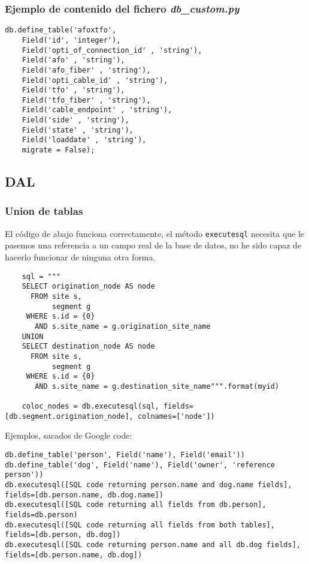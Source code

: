 \documentclass[12pt,spanish,]{article}
\begin{document}
\subsubsection{\texorpdfstring{Ejemplo de contenido del fichero
\emph{db\_custom.py}}{Ejemplo de contenido del fichero db\_custom.py}}\label{ejemplo-de-contenido-del-fichero-db_custom.py}

\begin{verbatim}
db.define_table('afoxtfo',
    Field('id', 'integer'),
    Field('opti_of_connection_id' , 'string'),
    Field('afo' , 'string'),
    Field('afo_fiber' , 'string'),
    Field('opti_cable_id' , 'string'),
    Field('tfo' , 'string'),
    Field('tfo_fiber' , 'string'),
    Field('cable_endpoint' , 'string'),
    Field('side' , 'string'),
    Field('state' , 'string'),
    Field('loaddate' , 'string'),
    migrate = False);
\end{verbatim}

\subsection{DAL}\label{dal}

\subsubsection{Union de tablas}\label{union-de-tablas}

El código de abajo funciona correctamente, el método \texttt{executesql}
necesita que le pasemos una referencia a un campo real de la base de
datos, no he sido capaz de hacerlo funcionar de ninguna otra forma.

\begin{verbatim}
    sql = """
    SELECT origination_node AS node
      FROM site s,
           segment g
     WHERE s.id = {0}
       AND s.site_name = g.origination_site_name
    UNION
    SELECT destination_node AS node
      FROM site s,
           segment g
     WHERE s.id = {0}
       AND s.site_name = g.destination_site_name""".format(myid)

    coloc_nodes = db.executesql(sql, fields=[db.segment.origination_node], colnames=['node'])
\end{verbatim}

Ejemplos, sacados de Google code:

\begin{verbatim}
db.define_table('person', Field('name'), Field('email'))
db.define_table('dog', Field('name'), Field('owner', 'reference person'))
db.executesql([SQL code returning person.name and dog.name fields], fields=[db.person.name, db.dog.name])
db.executesql([SQL code returning all fields from db.person], fields=db.person)
db.executesql([SQL code returning all fields from both tables], fields=[db.person, db.dog])
db.executesql([SQL code returning person.name and all db.dog fields], fields=[db.person.name, db.dog])
\end{verbatim}
\end{document}
